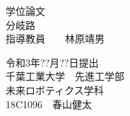 \begin{titlepage}
\begin{center}

{\huge 学位論文}\\
\vspace{80truept}
{\huge 分岐路}\\
\vspace{80truept}
{\huge 指導教員　　林原靖男}\\
\vspace{50truept}

{\huge 令和3年??月??日提出}\\
\vspace{30truept}
{\huge 千葉工業大学　先進工学部　\\ 未来ロボティクス学科}\\
\vspace{30truept}
{\huge 18C1096　春山健太}\\
\vspace{50truept}

\end{center}
\end{titlepage}
